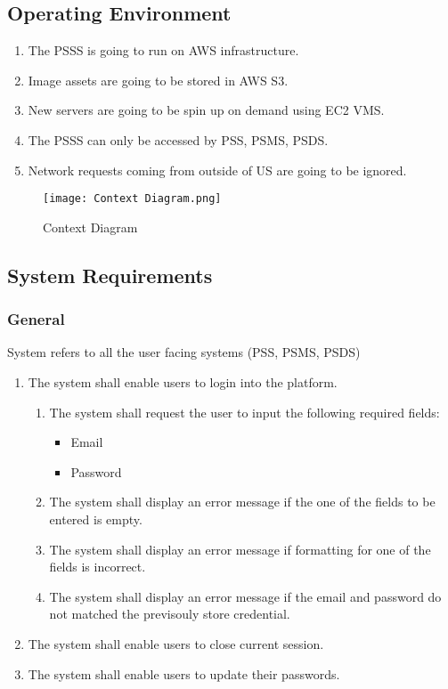\subsection{Operating Environment}
\begin{enumerate}[label=OE-\arabic*]
    \item The PSSS is going to run on AWS infrastructure.
    \item Image assets are going to be stored in AWS S3.
    \item New servers are going to be spin up on demand using EC2 VMS.
    \item The PSSS can only be accessed by PSS, PSMS, PSDS.
    \item Network requests coming from outside of US are going to be ignored.
\end{enumerate}
\begin{figure}[!htb]
    \centering
    \texttt{[image: Context Diagram.png]}
    \caption{Context Diagram}
\end{figure}
\pagebreak
\subsection{System Requirements}
\subsubsection{General}
System refers to all the user facing systems (PSS, PSMS, PSDS)
\begin{enumerate}[label=SY-\arabic*]
    \item The system shall enable users to login into the platform.
    \begin{enumerate}[label=SY-1.\arabic*]
        \item The system shall request the user to input the following required 
        fields:
        \begin{itemize}
            \item Email
            \item Password
        \end{itemize}
        \item The system shall display an error message if the one of the fields 
        to be entered is empty.
        \item The system shall display an error message if formatting for one 
        of the fields is incorrect.
        \item The system shall display an error message if the email and 
        password do not matched the previsouly store credential.
    \end{enumerate}
    \item The system shall enable users to close current session.
    \item The system shall enable users to update their passwords.
\end{enumerate}
